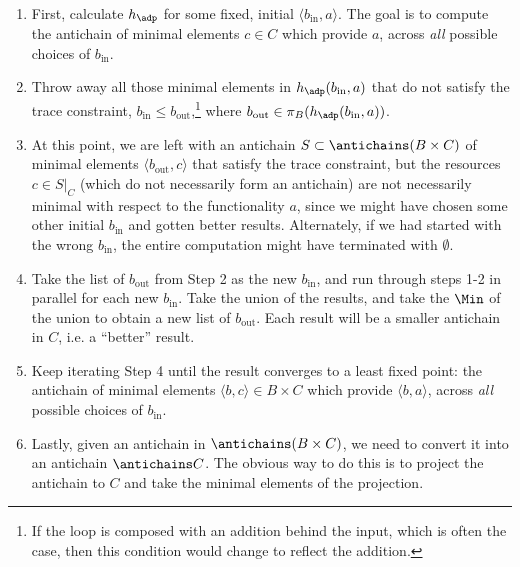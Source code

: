 \begin{enumerate}
\item First, calculate $h_\adp$ for some fixed, initial $\langle b_{\text{in}},a \rangle$. The goal is to compute the antichain of minimal elements $c \in C$ which provide $a$, across \emph{all} possible choices of $b_{\text{in}}$.
\item Throw away all those minimal elements in $h_\adp(b_{\text{in}},a)$ that do not satisfy the trace constraint, $b_{\text{in}} \leq b_{\text{out}}$,\footnote{If the loop is composed with an addition behind the input, which is often the case, then this condition would change to reflect the addition.} where $b_{\text{out}} \in \pi_B(h_\adp(b_{\text{in}},a))$.
\item At this point, we are left with an antichain $S \subset \antichains (B \times C)$ of minimal elements $\langle b_{\text{out}},c \rangle$ that satisfy the trace constraint, but the resources $c \in S|_C$ (which do not necessarily form an antichain) are not necessarily minimal with respect to the functionality $a$, since we might have chosen some other initial $b_{\text{in}}$ and gotten better results. Alternately, if we had started with the wrong $b_{\text{in}}$, the entire computation might have terminated with $\emptyset$.
\item Take the list of $b_{\text{out}}$ from Step 2 as the new $b_{\text{in}}$, and run through steps 1-2 in parallel for each new $b_{\text{in}}$. Take the union of the results, and take the $\Min$ of the union to obtain a new list of $b_{\text{out}}$. Each result will be a smaller antichain in $C$, i.e. a ``better'' result.
\item Keep iterating Step 4 until the result converges to a least fixed point: the antichain of minimal elements $\langle b, c \rangle \in B \times C$ which provide $\langle b, a \rangle$, across \emph{all} possible choices of $b_{\text{in}}$.
\item Lastly, given an antichain in $\antichains (B\times C)$, we need to convert it into an antichain $\antichains C$. The obvious way to do this is to project the antichain to $C$ and take the minimal elements of the projection.


\end{enumerate}

